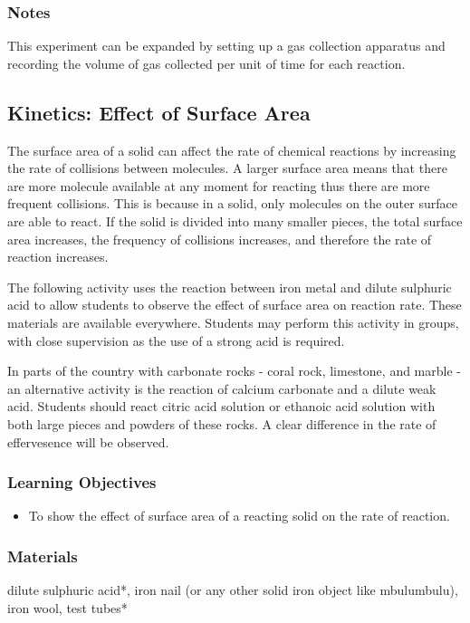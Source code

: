 \subsubsection*{Notes}
This experiment can be expanded by setting up a gas collection apparatus and recording the volume of gas collected per unit of time for each reaction.

\subsection{Kinetics: Effect of Surface Area}

The surface area of a solid can affect the rate of chemical reactions by increasing the rate of collisions between molecules. A larger surface area means that there are more molecule available at any moment for reacting thus there are more frequent collisions. This is because in a solid, only molecules on the outer surface are able to react. If the solid is divided into many smaller pieces, the total surface area increases, the frequency of collisions increases, and therefore the rate of reaction increases.

The following activity uses the reaction between iron metal and dilute sulphuric acid to allow students to observe the effect of surface area on reaction rate. These materials are available everywhere. Students may perform this activity in groups, with close supervision as the use of a strong acid is required.

In parts of the country with carbonate rocks - coral rock, limestone, and marble - an alternative activity is the reaction of calcium carbonate and a dilute weak acid. Students should react citric acid solution or ethanoic acid solution with both large pieces and powders of these rocks. A clear difference in the rate of effervesence will be observed.

\subsubsection*{Learning Objectives}
\begin{itemize}
\item{To show the effect of surface area of a reacting solid on the rate of reaction.}
\end{itemize}

\subsubsection*{Materials}
dilute sulphuric acid*, iron nail (or any other solid iron object like mbulumbulu), iron wool, test tubes*

